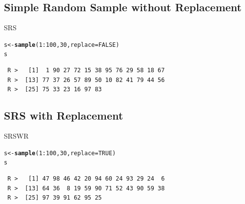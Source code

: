 \documentclass[10pt]{beamer}\usepackage[]{graphicx}\usepackage[]{xcolor}
\makeatletter
\newcommand{\hlnum}[1]{\textcolor[rgb]{0.686,0.059,0.569}{#1}}%
\newcommand{\hlopt}[1]{\textcolor[rgb]{0,0,0}{#1}}%
\newcommand{\hlstd}[1]{\textcolor[rgb]{0.345,0.345,0.345}{#1}}%
\newcommand{\hlkwb}[1]{\textcolor[rgb]{0.69,0.353,0.396}{#1}}%
\newcommand{\hlkwc}[1]{\textcolor[rgb]{0.333,0.667,0.333}{#1}}%
\newcommand{\hlkwd}[1]{\textcolor[rgb]{0.737,0.353,0.396}{\textbf{#1}}}%
\newenvironment{kframe}{%
 \def\at@end@of@kframe{}%
 \ifinner\ifhmode%
  \def\at@end@of@kframe{\end{minipage}}%
  \begin{minipage}{\columnwidth}%
 \fi\fi%
 \def\FrameCommand##1{\hskip\@totalleftmargin \hskip-\fboxsep
 \colorbox{shadecolor}{##1}\hskip-\fboxsep
     \hskip-\linewidth \hskip-\@totalleftmargin \hskip\columnwidth}%
 \MakeFramed {\advance\hsize-\width
   \@totalleftmargin\z@ \linewidth\hsize
   \@setminipage}}%
 {\par\unskip\endMakeFramed%
 \at@end@of@kframe}
\newenvironment{knitrout}{}{} %
\makeatother
\begin{document}
\subsection{Simple Random Sample without Replacement}
\begin{frame}[containsverbatim]{SRS}
\small

\begin{knitrout}
\color{fgcolor}\begin{kframe}
\begin{alltt}
\hlstd{s} \hlkwb{<-} \hlkwd{sample}\hlstd{(}\hlnum{1}\hlopt{:}\hlnum{100}\hlstd{,} \hlnum{30}\hlstd{,} \hlkwc{replace} \hlstd{=} \hlnum{FALSE}\hlstd{)}
\hlstd{s}
\end{alltt}
\begin{verbatim}
 R >   [1]  1 90 27 72 15 38 95 76 29 58 18 67
 R >  [13] 77 37 26 57 89 50 10 82 41 79 44 56
 R >  [25] 75 33 23 16 97 83
\end{verbatim}
\end{kframe}
\end{knitrout}

\end{frame}


\subsection[containsverbatim]{SRS with Replacement}
\begin{frame}[containsverbatim]{SRSWR}
\small
\begin{knitrout}
\color{fgcolor}\begin{kframe}
\begin{alltt}
\hlstd{s} \hlkwb{<-} \hlkwd{sample}\hlstd{(}\hlnum{1}\hlopt{:}\hlnum{100}\hlstd{,} \hlnum{30}\hlstd{,} \hlkwc{replace} \hlstd{=} \hlnum{TRUE}\hlstd{)}
\hlstd{s}
\end{alltt}
\begin{verbatim}
 R >   [1] 47 98 46 42 20 94 60 24 93 29 24  6
 R >  [13] 64 36  8 19 59 90 71 52 43 90 59 38
 R >  [25] 97 39 91 62 95 25
\end{verbatim}
\end{kframe}
\end{knitrout}

\end{frame}
\end{document}
